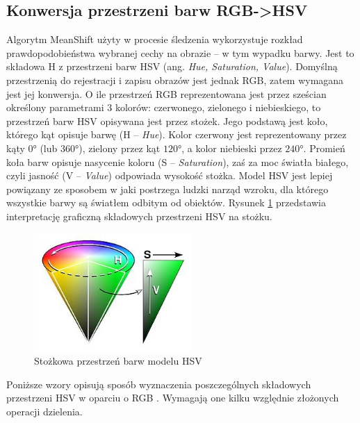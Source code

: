\subsection{Konwersja przestrzeni barw RGB->HSV}
\label{sec:rgb2hsv} 


Algorytm MeanShift użyty w procesie śledzenia wykorzystuje rozkład prawdopodobieństwa wybranej cechy na obrazie -- w tym wypadku barwy. 
Jest to składowa H z przestrzeni barw HSV (ang. \textit{Hue, Saturation, Value}). 
Domyślną przestrzenią do rejestracji i zapisu obrazów jest jednak RGB, zatem wymagana jest jej konwersja. 
O ile przestrzeń RGB reprezentowana jest przez sześcian określony parametrami 3 kolorów: czerwonego, zielonego i niebieskiego, to przestrzeń barw HSV opisywana jest przez stożek. 
Jego podstawą jest koło, którego kąt opisuje barwę (H -- \textit{Hue}).
Kolor czerwony jest reprezentowany przez kąty $0$\si{\degree} (lub $360$\si{\degree}), zielony przez kąt $120$\si{\degree}, a kolor niebieski przez $240$\si{\degree}. 
Promień koła barw opisuje nasycenie koloru (S -- \textit{Saturation}), zaś za moc światła białego, czyli jasność (V -- \textit{Value}) odpowiada wysokość stożka. 
Model HSV jest lepiej powiązany ze sposobem w jaki postrzega ludzki narząd wzroku, dla którego wszystkie barwy są światłem odbitym od obiektów.
Rysunek \ref{fig:HSV_cone} przedstawia interpretację graficzną składowych przestrzeni HSV na stożku.

\begin{figure}[h]
	\centering
	\includegraphics[width=6cm]{2_HSV.jpg}
	\caption{Stożkowa przestrzeń barw modelu HSV \cite{HSV}} 
	\label{fig:HSV_cone}
\end{figure}

Poniższe wzory opisują sposób wyznaczenia poszczególnych składowych przestrzeni HSV w oparciu o RGB \cite{Kryjak}. 
Wymagają one kilku względnie złożonych operacji dzielenia.

